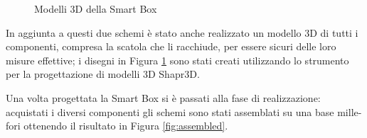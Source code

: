 \documentclass[a4paper, 12pt]{report}
\begin{document}
\begin{figure}[htbp]
  \centering
  \caption{Modelli 3D della Smart Box}
  \label{fig:models}
\end{figure}

In aggiunta a questi due schemi è stato anche realizzato un modello 3D di tutti i componenti, compresa la scatola che li racchiude, per essere sicuri delle loro misure effettive; 
i disegni in Figura \ref{fig:models} sono stati creati utilizzando lo strumento per la progettazione di modelli 3D Shapr3D\cite{shapr3d}. 

Una volta progettata la Smart Box si è passati alla fase di realizzazione: acquistati i diversi componenti gli schemi sono stati assemblati su una base mille-fori ottenendo il risultato in Figura \ref{fig:assembled}.
\end{document}
